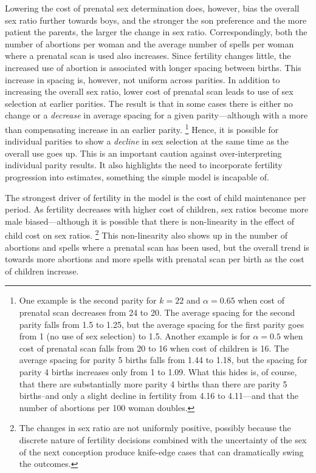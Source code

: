 \documentclass[12pt,letterpaper]{article}
\begin{document}
Lowering the cost of prenatal sex determination does, however, bias the overall sex 
ratio further towards boys, and the stronger the son preference and the 
more patient the parents, the larger the change in sex ratio.
Correspondingly, both the number of abortions per woman and the
average number of spells per woman where a prenatal scan is used also increases.
Since fertility changes little, the increased use of abortion
is associated with longer spacing between births.
This increase in spacing is, however, not uniform across parities.
In addition to increasing the overall sex ratio, lower cost of prenatal 
scan leads to use of sex selection at earlier parities.
The result is that in some cases there is either no change or a \emph{decrease} 
in average spacing for a given parity---although with a more than compensating 
increase in an earlier parity.%
\footnote{
One example is the second parity for $k= 22$ and $\alpha = 0.65$
when cost of prenatal scan decreases from 24 to 20.
The average spacing for the second parity falls from 1.5 to 1.25,
but the average spacing for the first parity goes from 1 (no
use of sex selection) to 1.5.
Another example is for $\alpha = 0.5$ when cost of prenatal scan falls 
from 20 to 16 when cost of children is 16. 
The average spacing for parity 5 births falls from 1.44 to 1.18, but
the spacing for parity 4 births increases only from 1 to 1.09. 
What this hides is, of course, that there are substantially more 
parity 4 births than there are parity 5 births--and only a slight 
decline in fertility from 4.16 to 4.11---and that the number of
abortions per 100 woman doubles. 
}
Hence, it is possible for individual parities to show a \emph{decline}
in sex selection at the same time as the overall use goes up.
This is an important caution against over-interpreting
individual parity results.
It also highlights the need to incorporate fertility progression into
estimates, something the simple model is incapable of.



The strongest driver of fertility in the model is the cost of
child maintenance per period.
As fertility decreases with higher cost of children, sex ratios 
become more male biased---although it is possible that there is 
non-linearity in the effect of child cost on sex ratios.%
\footnote{
The changes in sex ratio are not uniformly positive, possibly because 
the discrete nature of fertility decisions combined with the uncertainty 
of the sex of the next conception produce knife-edge cases that can
dramatically swing the outcomes.
}
This non-linearity also shows up in the number of abortions 
and spells where a prenatal scan has been used, 
but the overall trend is towards more abortions and more spells with
prenatal scan per birth as the cost of children increase.
\end{document}
